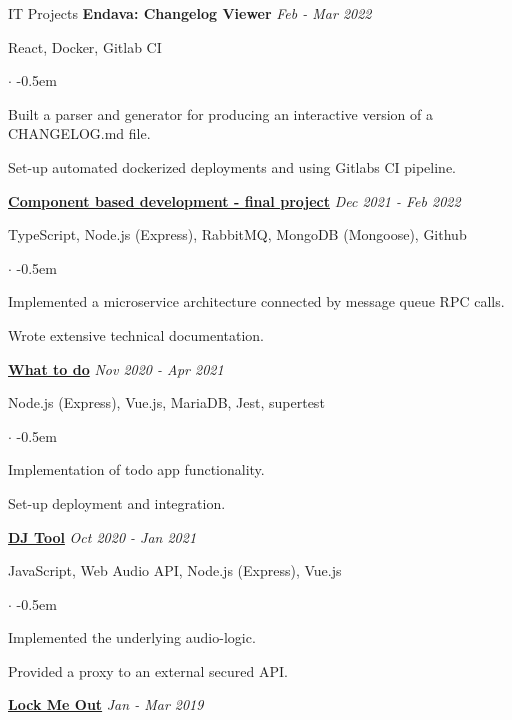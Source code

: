 \documentclass{cv}
\begin{document}
\begin{rSection}{IT Projects}
  \textbf{Endava: Changelog Viewer}
  \hfill
  {\em Feb - Mar 2022}

  React, Docker, Gitlab CI
  \begin{list}{$\cdot$}{}
  \itemsep -0.5em \vspace{-0.5em}
    \smallskip
  \item Built a parser and generator for producing an interactive version of a CHANGELOG.md file.
  \item Set-up automated dockerized deployments and using Gitlabs CI pipeline.
  \end{list}

  \textbf{\href{https://github.com/htw-kbe-jneidel/main}{Component based development - final project}}
  \hfill
  {\em Dec 2021 - Feb 2022}

  TypeScript, Node.js (Express), RabbitMQ, MongoDB (Mongoose), Github
  \begin{list}{$\cdot$}{}
  \itemsep -0.5em \vspace{-0.5em}
    \smallskip
  \item Implemented a microservice architecture connected by message queue RPC calls.
  \item Wrote extensive technical documentation.
  \end{list}

  \textbf{\href{https://github.com/jneidel/what-to-do}{What to do}}
  \hfill
  {\em Nov 2020 - Apr 2021}

  Node.js (Express), Vue.js, MariaDB, Jest, supertest
  \begin{list}{$\cdot$}{}
  \itemsep -0.5em \vspace{-0.5em}
    \smallskip
  \item Implementation of todo app functionality.
  \item Set-up deployment and integration.
  \end{list}

  \textbf{\href{https://github.com/vyvytn/avt}{DJ Tool}}
  \hfill
  {\em Oct 2020 - Jan 2021}

  JavaScript, Web Audio API, Node.js (Express), Vue.js
  \begin{list}{$\cdot$}{}
  \itemsep -0.5em \vspace{-0.5em}
    \smallskip
  \item Implemented the underlying audio-logic.
  \item Provided a proxy to an external secured API.
  \end{list}

  \textbf{\href{https://github.com/jneidel/lock-me-out}{Lock Me Out}}
  \hfill
  {\em Jan - Mar 2019}


\end{rSection}
\end{document}
